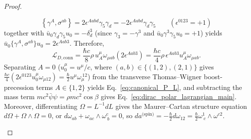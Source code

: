 \documentclass[11pt, a4paper]{article}
\theoremstyle{definition}
\begin{document}
\begin{proof}
\begin{enumerate}[label=\arabic*., nosep]
    \begin{equation}
    \label{eq:clifford_anticomm}
    \left\{ \gamma^A, \sigma^{ab} \right\} = 2\epsilon^{Aabd}\gamma_5\gamma_d = -2\epsilon^{Aabd}\gamma_d\gamma_5 \qquad (\epsilon^{0123} = +1)
    \end{equation}
    together with $\bar{u}_0 \gamma_d \gamma_5 u_0 = -\delta_d^3$ (since $\gamma_3 = -\gamma^3$ and $\bar{u}_0 \gamma^3 \gamma_5 u_0 = +1$) yields $\bar{u}_0 \{\gamma^A, \sigma^{ab}\} u_0 = 2\epsilon^{Aab3}$. Therefore,
    \begin{equation}
    \mathcal{L}_{D,\text{conn}} = \frac{\hbar c}{8}\rho\,u_A^\mu \omega_{\mu ab} \left(2\epsilon^{Aab3}\right) = \frac{\hbar c}{4}\rho\,\epsilon^{Aab3} u_A^\mu \omega_{\mu ab}.
    \end{equation}
    Separating $A=0$ ($u_0^\mu = u^\mu / c$, where $(a,b) \in \{(1,2),(2,1)\}$ gives $\frac{\hbar c}{4}(2\epsilon^{0123} u_0^\mu \omega_{\mu 12}) = \frac{\hbar}{2} u^\mu \omega_\mu^{\ 12}$) from the transverse Thomas--Wigner boost-precession terms $A \in \{1,2\}$ yields Eq.~\eqref{eq:canonical_P_L}, and subtracting the mass term $mc^2\bar{\psi}\psi = \rho mc^2 \cos\beta$ gives Eq.~\eqref{eq:dirac_polar_lagrangian_main}. Moreover, differentiating $\Omega = L^{-1}dL$ gives the Maurer--Cartan structure equation $d\Omega + \Omega\wedge\Omega = 0$, or $d\omega_{ab} + \omega_{ac}\wedge\omega^c_{\ b} = 0$, so $da^{\text{(spin)}} = -\frac{\hbar}{2}d\omega_{12} = \frac{\hbar}{2}\omega^1_{\ c}\wedge\omega^{c2}$.
\end{enumerate}


\end{proof}
\end{document}
